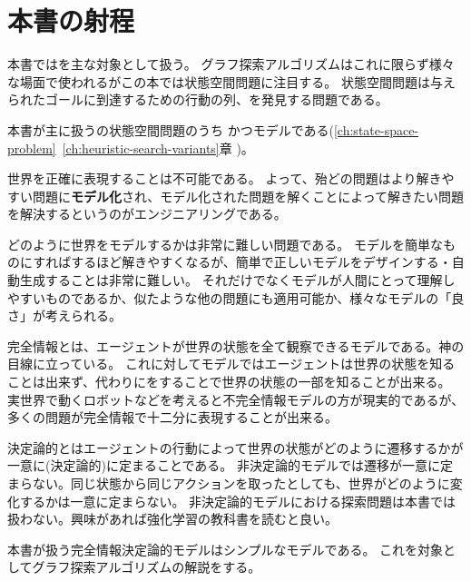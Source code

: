 \section{本書の射程}
\label{sec:coverage}

本書ではを主な対象として扱う。
グラフ探索アルゴリズムはこれに限らず様々な場面で使われるがこの本では状態空間問題に注目する。
状態空間問題は与えられたゴールに到達するための行動の列、を発見する問題である。

本書が主に扱うの状態空間問題のうち
かつモデルである(\ref{ch:state-space-problem}~\ref{ch:heuristic-search-variants}章
)。

世界を正確に表現することは不可能である。
よって、殆どの問題はより解きやすい問題に{\bf モデル化}され、モデル化された問題を解くことによって解きたい問題を解決するというのがエンジニアリングである。

どのように世界をモデルするかは非常に難しい問題である。
モデルを簡単なものにすればするほど解きやすくなるが、簡単で正しいモデルをデザインする・自動生成することは非常に難しい。
それだけでなくモデルが人間にとって理解しやすいものであるか、似たような他の問題にも適用可能か、様々なモデルの「良さ」が考えられる。

完全情報とは、エージェントが世界の状態を全て観察できるモデルである。神の目線に立っている。
これに対してモデルではエージェントは世界の状態を知ることは出来ず、代わりにをすることで世界の状態の一部を知ることが出来る。
実世界で動くロボットなどを考えると不完全情報モデルの方が現実的であるが、多くの問題が完全情報で十二分に表現することが出来る。

決定論的とはエージェントの行動によって世界の状態がどのように遷移するかが一意に(決定論的)に定まることである。
非決定論的モデルでは遷移が一意に定まらない。同じ状態から同じアクションを取ったとしても、世界がどのように変化するかは一意に定まらない。
非決定論的モデルにおける探索問題は本書では扱わない。興味があれば強化学習の教科書を読むと良い\cite{sutton1998introduction}。


本書が扱う完全情報決定論的モデルはシンプルなモデルである。
これを対象としてグラフ探索アルゴリズムの解説をする。

